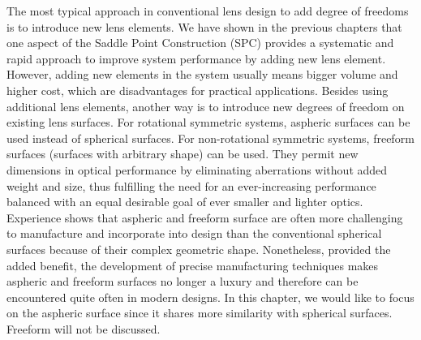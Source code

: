 The most typical approach in conventional lens design to add degree of freedoms is to introduce new lens elements. We have shown in the previous chapters that one aspect of the Saddle Point Construction (SPC) provides a systematic and rapid approach to improve system performance by adding new lens element. However, adding new elements in the system usually means bigger volume and higher cost, which are disadvantages for practical applications. 
Besides using additional lens elements, another way is to introduce new degrees of freedom on existing lens surfaces. For rotational symmetric systems, aspheric surfaces can be used instead of spherical surfaces. For non-rotational symmetric systems, freeform surfaces (surfaces with arbitrary shape) can be used. They permit new dimensions in optical performance by eliminating aberrations without added weight and size, thus fulfilling the need for an ever-increasing performance balanced with an equal desirable goal of ever smaller and lighter optics. Experience shows that aspheric and freeform surface are often more challenging to manufacture and incorporate into design than the conventional spherical surfaces because of their complex geometric shape. Nonetheless, provided the added benefit, the development of precise manufacturing techniques makes aspheric and freeform surfaces no longer a luxury and therefore can be encountered quite often in modern designs. In this chapter, we would like to focus on the aspheric surface since it shares more similarity with spherical surfaces. Freeform will not be discussed. 


